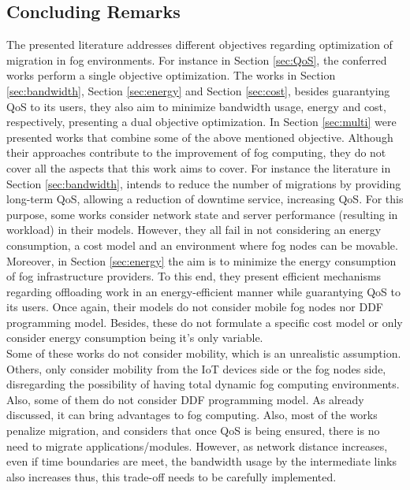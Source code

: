 \subsection{Concluding Remarks}
The presented literature addresses different objectives regarding optimization of migration in fog environments. For instance in Section \ref{sec:QoS}, the conferred works perform a single objective optimization. The works in Section \ref{sec:bandwidth}, Section \ref{sec:energy} and Section \ref{sec:cost}, besides guarantying QoS to its users, they also aim to minimize bandwidth usage, energy and cost, respectively, presenting a dual objective optimization. In Section \ref{sec:multi} were presented works that combine some of the above mentioned objective. Although their approaches contribute to the improvement of fog computing, they do not cover all the aspects that this work aims to cover. For instance the literature in Section \ref{sec:bandwidth}, intends to reduce the number of migrations by providing long-term QoS, allowing a reduction of downtime service, increasing QoS. For this purpose, some works consider network state and server performance (resulting in workload) in their models. However, they all fail in not considering an energy consumption, a cost model and an environment where fog nodes can be movable. Moreover, in Section \ref{sec:energy} the aim is to minimize the energy consumption of fog infrastructure providers. To this end, they present efficient mechanisms regarding offloading work in an energy-efficient manner while guarantying QoS to its users. Once again, their models do not consider mobile fog nodes nor DDF programming model. Besides, these do not formulate a specific cost model or only consider energy consumption being it's only variable.\\
\noindent\tab Some of these works do not consider mobility, which is an unrealistic assumption. Others, only consider mobility from the IoT devices side or the fog nodes side, disregarding the possibility of having total dynamic fog computing environments. Also, some of them do not consider DDF programming model. As already discussed, it can bring advantages to fog computing. Also, most of the works penalize migration, and considers that once QoS is being ensured, there is no need to migrate applications/modules. However, as network distance increases, even if time boundaries are meet, the bandwidth usage by the intermediate links also increases thus, this trade-off needs to be carefully implemented.